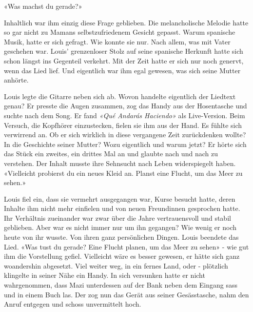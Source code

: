 «Was machst du gerade?» 

Inhaltlich war ihm einzig diese Frage geblieben. Die melancholische Melodie hatte so gar nicht zu Mamans
selbstzufriedenem Gesicht gepasst. Warum spanische Musik, hatte
er sich gefragt. Wie konnte sie nur. Nach allem, was mit Vater geschehen
war. Louis’ grenzenloser Stolz auf seine spanische Herkunft hatte sich
schon längst ins Gegenteil verkehrt. Mit der Zeit hatte er sich nur noch
genervt, wenn das Lied lief. Und eigentlich war ihm egal gewesen, was
sich seine Mutter anhörte. 

Louis legte die Gitarre neben sich ab. Wovon handelte eigentlich der Liedtext genau?
Er presste die Augen zusammen, zog das Handy aus der Hosentasche und
suchte nach dem Song. Er fand \emph{«Qué Andarás Haciendo»} als Live-Version. Beim Versuch, die Kopfhörer einzustecken, fielen sie ihm
aus der Hand. Es fühlte sich verwirrend an. Ob er sich wirklich in diese vergangene Zeit zurückdenken wollte?  
In die Geschichte seiner Mutter? Wozu eigentlich und warum jetzt?
Er hörte sich das Stück ein zweites, ein drittes Mal an und glaubte nach
und nach zu verstehen. Der Inhalt musste ihre Sehnsucht nach Leben widerspiegelt haben. 
«Vielleicht probierst du ein neues Kleid an. Planst eine Flucht, um das Meer zu sehen.»


Louis fiel ein, dass sie vermehrt ausgegangen war, Kurse besucht hatte, deren Inhalte ihm nicht mehr
einfielen und von neuen Freundinnen gesprochen hatte. Ihr Verhältnis zueinander war zwar über die Jahre vertrauensvoll und
stabil geblieben. Aber war es nicht immer nur um ihn gegangen?
Wie wenig er noch heute von ihr wusste. Von ihren ganz persönlichen Dingen. 
Louis beendete das Lied. «Was tust du gerade? Eine Flucht planen, um das Meer zu sehen» - wie gut ihm die Vorstellung gefiel. 
Vielleicht wäre es besser gewesen, er hätte sich ganz woandershin abgesetzt. Viel weiter weg, in ein fernes Land, oder - 
plötzlich klingelte in seiner Nähe ein Handy. In sich versunken hatte er nicht wahrgenommen, dass Mazi 
unterdessen auf der Bank neben dem Eingang sass und in einem Buch las. Der zog nun das Gerät aus seiner Gesässtasche, 
nahm den Anruf entgegen und schoss unvermittelt hoch. 
